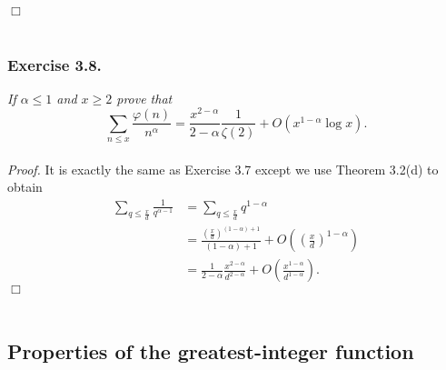 \documentclass{article}
\begin{document}
$\Box$ \\\\






\subsubsection*{Exercise 3.8.}
\emph{If $\alpha \leq 1$ and $x \geq 2$ prove that}
\[
  \sum_{n \leq x} \frac{\varphi(n)}{n^{\alpha}}
  = \frac{x^{2 - \alpha}}{2 - \alpha}\frac{1}{\zeta(2)}
      + O(x^{1-\alpha} \log x).
\] \\



\emph{Proof.}
  It is exactly the same as Exercise 3.7 except we use Theorem 3.2(d) to obtain
  \begin{align*}
    \sum_{q \leq \frac{x}{d}} \frac{1}{q^{\alpha-1}}
    &= \sum_{q \leq \frac{x}{d}} q^{1-\alpha} \\
    &= \frac{\left( \frac{x}{d} \right)^{(1-\alpha) + 1}}{(1-\alpha) + 1}
        + O\left( \left(\frac{x}{d}\right)^{1-\alpha} \right) \\
    &= \frac{1}{2 - \alpha} \frac{x^{2 - \alpha}}{d^{2 - \alpha}}
        + O\left( \frac{x^{1-\alpha}}{d^{1-\alpha}} \right).
  \end{align*}
$\Box$ \\\\









\subsection*{Properties of the greatest-integer function \\}



\end{document}
